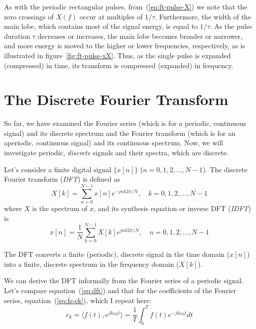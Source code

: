 As with the periodic rectangular pulses, from~(\ref{eq:ft-pulse-X}) we
note that the zero crossings of $X(f)$ occur at multiples of $1/\tau$.
Furthermore, the width of the main lobe, which contains most of the
signal energy, is equal to $1/\tau$. As the pulse duration $\tau$
decreases or increases, the main lobe becomes broader or narrower, and
more energy is moved to the higher or lower frequencies, respectively,
as is illustrated in figure~\ref{fig:ft-pulse-xX}. Thus, as the single
pulse is expanded (compressed) in time, its transform is compressed
(expanded) in frequency.

\section{The Discrete Fourier Transform}

So far, we have examined the Fourier series (which is for a
periodic, continuous signal) and its discrete spectrum and the Fourier
transform (which is for an aperiodic, continuous signal) and its
continuous spectrum. Now, we will investigate periodic, \emph{discrete}
signals and their spectra, which are discrete.

Let's consider a finite digital signal $\{x[n]\}$ ($n=0,1,2,\ldots,
N-1$). The discrete Fourier transform (\emph{DFT}) is defined as
\begin{equation}
X[k] = \sum_{n=0}^{N-1} x[n] e^{-j n k 2\pi/N}, \quad k = 0,1,2,\ldots,
N-1
\label{eq:dft}
\end{equation}
where $X$ is the spectrum of $x$, and its synthesis equation or
inverse DFT (\emph{IDFT}) is
\begin{equation}
x[n]=\frac{1}{N} \sum_{k=0}^{N-1} X[k] e^{j n k 2\pi/N}, \quad
n=0,1,2,\ldots, N-1
\label{eq:idft}
\end{equation}

The DFT converts a finite (periodic), discrete signal in
the time domain ($x[n]$) into a finite, discrete spectrum in the frequency
domain ($X[k]$).

We can derive the DFT informally from the Fourier series of a periodic
signal. Let's compare equation~(\ref{eq:dft}) and that for the
coefficients of the Fourier series, equation~(\ref{eq:fs-ck}), which I
repeat here:
\begin{equation}
c_k=\langle f(t), e^{jk\omega_0 t}\rangle = \frac{1}{T}\int_0^T f(t)e^{-jk\omega_0
t}dt
\label{eq:fs-ckrepeat}
\end{equation}

